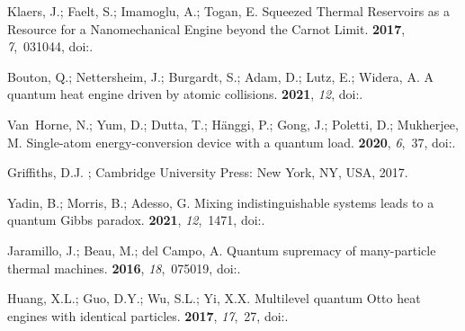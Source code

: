 \documentclass[preprints,article,accept,moreauthors,pdftex]{Definitions/mdpi}
\begin{document}
\begin{thebibliography}{999}
Klaers, J.; Faelt, S.; Imamoglu, A.; Togan, E.
\newblock Squeezed Thermal Reservoirs as a Resource for a Nanomechanical Engine
  beyond the {Carnot} Limit.
 {\bf 2017}, {\em 7},~031044,
\newblock
  doi:{\href{https://doi.org/10.1103/PhysRevX.7.031044}{}}.

Bouton, Q.; Nettersheim, J.; Burgardt, S.; Adam, D.; Lutz, E.; Widera, A.
\newblock A quantum heat engine driven by atomic collisions.
 {\bf 2021}, {\em 12},
\newblock
  doi:{\href{https://doi.org/10.1038/s41467-021-22222-z}{}}.

Van~Horne, N.; Yum, D.; Dutta, T.; H{\"a}nggi, P.; Gong, J.; Poletti, D.;
  Mukherjee, M.
\newblock Single-atom energy-conversion device with a quantum load.
 {\bf 2020}, {\em 6},~37,
\newblock
  doi:{\href{https://doi.org/10.1038/s41534-020-0264-6}{}}.

Griffiths, D.J.
; Cambridge University Press:
  New York, NY, USA,  2017.

Yadin, B.; Morris, B.; Adesso, G.
\newblock Mixing indistinguishable systems leads to a quantum {G}ibbs paradox.
 {\bf 2021}, {\em 12},~1471,
\newblock
  doi:{\href{https://doi.org/10.1038/s41467-021-21620-7}{}}.

Jaramillo, J.; Beau, M.; del Campo, A.
\newblock Quantum supremacy of many-particle thermal machines.
 {\bf 2016}, {\em 18},~075019,
\newblock
  doi:{\href{https://doi.org/10.1088/1367-2630/18/7/075019}{}}.

Huang, X.L.; Guo, D.Y.; Wu, S.L.; Yi, X.X.
\newblock Multilevel quantum {Otto} heat engines with identical particles.
 {\bf 2017}, {\em 17},~27,
\newblock
  doi:{\href{https://doi.org/10.1007/s11128-017-1795-4}{}}.


\end{thebibliography}
\end{document}
